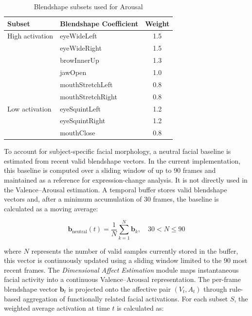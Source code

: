 \documentclass[letterpaper, 10 pt, conference]{ieeeconf}  %
\begin{document}
\begin{table}[htbp]
\caption{Blendshape subsets used for Arousal}
\label{tab:arousal_subsets}
\centering
\setlength{\tabcolsep}{4pt}
\renewcommand{\arraystretch}{1.05}
\small
\begin{tabular}{l l c}
\hline
\textbf{Subset} & \textbf{Blendshape Coefficient} & \textbf{Weight} \\
\hline

High activation & eyeWideLeft       & 1.5 \\
                & eyeWideRight      & 1.5 \\
                & browInnerUp       & 1.3 \\
                & jawOpen           & 1.0 \\
                & mouthStretchLeft  & 0.8 \\
                & mouthStretchRight & 0.8 \\
\hline

Low activation  & eyeSquintLeft  & 1.2 \\
                & eyeSquintRight & 1.2 \\
                & mouthClose     & 0.8 \\
\hline
\end{tabular}
\end{table}

To account for subject-specific facial morphology, a neutral facial baseline is estimated from recent valid blendshape vectors. In the current implementation, this baseline is computed over a sliding window of up to 90 frames and maintained as a reference for expression-change analysis. It is not directly used in the Valence--Arousal estimation. A temporal buffer stores valid blendshape vectors and, after a minimum accumulation of 30 frames, the baseline is calculated as a moving average:

\begin{equation}
\mathbf{b}_{\text{neutral}}(t) =
\frac{1}{N}\sum_{k=1}^{N}\mathbf{b}_k,
\quad 30 < N \leq 90
\end{equation}

where $N$ represents the number of valid samples currently stored in the buffer, this vector is continuously updated using a sliding window limited to the 90 most recent frames. The \textit{Dimensional Affect Estimation} module maps instantaneous facial activity into a continuous Valence--Arousal representation. The per-frame blendshape vector $\mathbf{b}_t$ is projected onto the affective pair $(V_t, A_t)$ through rule-based aggregation of functionally related facial activations. For each subset $S$, the weighted average activation at time $t$ is calculated as:
\end{document}
